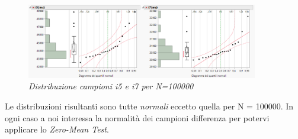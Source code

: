 \begin{figure}[H]
	\centering
	\includegraphics[width=0.9\textwidth]{img/hw0/100000.png}
	\caption{\textit{Distribuzione campioni i5 e i7 per N=100000}}
\end{figure}

Le distribuzioni risultanti sono tutte \textit{normali} eccetto quella per N = 100000. In ogni caso a noi interessa la normalità dei campioni differenza per potervi applicare lo \textit{Zero-Mean Test}.
\newpage
